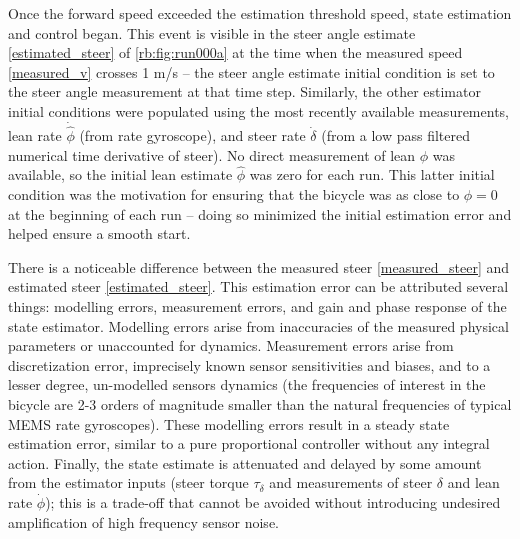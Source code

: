 Once the forward speed exceeded the estimation threshold speed, state
estimation and control began. This event is visible in the steer angle estimate
\ref{estimated_steer} of \autoref{rb:fig:run000a} at the time when the
measured speed \ref{measured_v} crosses 1 m/s -- the steer angle estimate
initial condition is set to the steer angle measurement at that time step.
Similarly, the other estimator initial conditions were populated using the most
recently available measurements, lean rate $\dot{\hat{\phi}}$ (from rate
gyroscope), and steer rate $\dot{\delta}$ (from a low pass filtered numerical
time derivative of steer). No direct measurement of lean $\phi$ was available,
so the initial lean estimate $\hat{\phi}$ was zero for each run.  This latter
initial condition was the motivation for ensuring that the bicycle was as close
to $\phi=0$ at the beginning of each run -- doing so minimized the initial
estimation error and helped ensure a smooth start.

There is a noticeable difference between the measured steer
\ref{measured_steer} and estimated steer \ref{estimated_steer}. This
estimation error can be attributed several things: modelling errors,
measurement errors, and gain and phase response of the state estimator.
Modelling errors arise from inaccuracies of the measured physical parameters or
unaccounted for dynamics.  Measurement errors arise from discretization error,
imprecisely known sensor sensitivities and biases, and to a lesser degree,
un-modelled sensors dynamics (the frequencies of interest in the bicycle are
2-3 orders of magnitude smaller than the natural frequencies of typical MEMS
rate gyroscopes). These modelling errors result in a steady state estimation
error, similar to a pure proportional controller without any integral action.
Finally, the state estimate is attenuated and delayed by some amount from the
estimator inputs (steer torque $\tau_\delta$ and measurements of steer $\delta$
and lean rate $\dot{\phi}$); this is a trade-off that cannot be avoided without
introducing undesired amplification of high frequency sensor noise.

